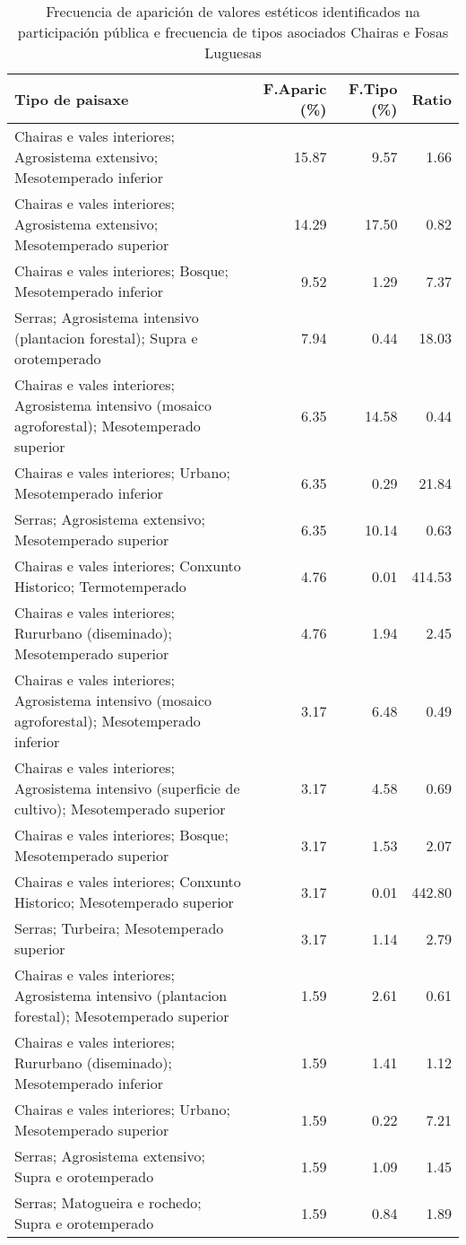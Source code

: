 \begin{table}[p]
\centering
\caption{Frecuencia de aparición de valores estéticos identificados na participación pública e frecuencia de tipos asociados Chairas e Fosas Luguesas} 
\label{vsixotest6}
\begin{tabular}{lrrr}
  \hline
Tipo de paisaxe & F.Aparic (\%) & F.Tipo (\%) & Ratio \\ 
  \hline
Chairas e vales interiores; Agrosistema extensivo; Mesotemperado inferior & 15.87 & 9.57 & 1.66 \\ 
  Chairas e vales interiores; Agrosistema extensivo; Mesotemperado superior & 14.29 & 17.50 & 0.82 \\ 
  Chairas e vales interiores; Bosque; Mesotemperado inferior & 9.52 & 1.29 & 7.37 \\ 
  Serras; Agrosistema intensivo (plantacion forestal); Supra e orotemperado & 7.94 & 0.44 & 18.03 \\ 
  Chairas e vales interiores; Agrosistema intensivo (mosaico agroforestal); Mesotemperado superior & 6.35 & 14.58 & 0.44 \\ 
  Chairas e vales interiores; Urbano; Mesotemperado inferior & 6.35 & 0.29 & 21.84 \\ 
  Serras; Agrosistema extensivo; Mesotemperado superior & 6.35 & 10.14 & 0.63 \\ 
  Chairas e vales interiores; Conxunto Historico; Termotemperado & 4.76 & 0.01 & 414.53 \\ 
  Chairas e vales interiores; Rururbano (diseminado); Mesotemperado superior & 4.76 & 1.94 & 2.45 \\ 
  Chairas e vales interiores; Agrosistema intensivo (mosaico agroforestal); Mesotemperado inferior & 3.17 & 6.48 & 0.49 \\ 
  Chairas e vales interiores; Agrosistema intensivo (superficie de cultivo); Mesotemperado superior & 3.17 & 4.58 & 0.69 \\ 
  Chairas e vales interiores; Bosque; Mesotemperado superior & 3.17 & 1.53 & 2.07 \\ 
  Chairas e vales interiores; Conxunto Historico; Mesotemperado superior & 3.17 & 0.01 & 442.80 \\ 
  Serras; Turbeira; Mesotemperado superior & 3.17 & 1.14 & 2.79 \\ 
  Chairas e vales interiores; Agrosistema intensivo (plantacion forestal); Mesotemperado superior & 1.59 & 2.61 & 0.61 \\ 
  Chairas e vales interiores; Rururbano (diseminado); Mesotemperado inferior & 1.59 & 1.41 & 1.12 \\ 
  Chairas e vales interiores; Urbano; Mesotemperado superior & 1.59 & 0.22 & 7.21 \\ 
  Serras; Agrosistema extensivo; Supra e orotemperado & 1.59 & 1.09 & 1.45 \\ 
  Serras; Matogueira e rochedo; Supra e orotemperado & 1.59 & 0.84 & 1.89 \\ 
   \hline
\end{tabular}
\end{table}
